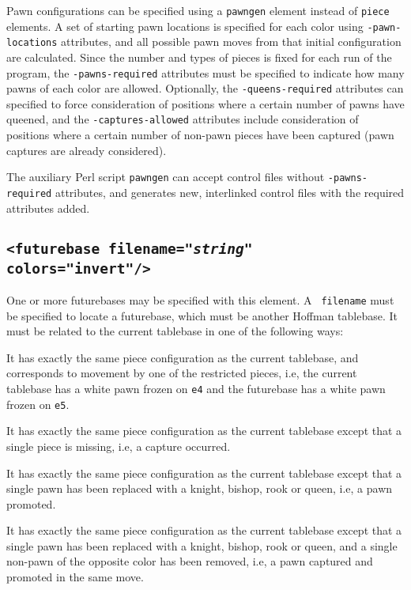\documentclass[11pt]{article}
\begin{document}
Pawn configurations can be specified using a {\tt pawngen} element
instead of {\tt piece} elements.  A set of starting pawn locations is
specified for each color using {\tt *-pawn-locations} attributes, and
all possible pawn moves from that initial configuration are
calculated.  Since the number and types of pieces is fixed for each
run of the program, the {\tt *-pawns-required} attributes must be
specified to indicate how many pawns of each color are allowed.
Optionally, the {\tt *-queens-required} attributes can specified to
force consideration of positions where a certain number of pawns have
queened, and the {\tt *-captures-allowed} attributes include
consideration of positions where a certain number of non-pawn pieces
have been captured (pawn captures are already considered).

The auxiliary Perl script {\tt pawngen} can accept control files
without {\tt *-pawns-required} attributes, and generates new,
interlinked control files with the required attributes added.

\subsection{\tt <futurebase filename="{\it string}" colors="invert"/>}

One or more futurebases may be specified with this element.  A {\tt
  filename} must be specified to locate a futurebase, which must be
another Hoffman tablebase.  It must be related to the current
tablebase in one of the following ways:

\begin{description}
\item It has exactly the same piece configuration as the
current tablebase, and corresponds to movement by one of the
restricted pieces, i.e, the current tablebase has a white pawn frozen
on {\tt e4} and the futurebase has a white pawn frozen on {\tt e5}.

\item It has exactly the same piece configuration as
the current tablebase except that a single piece is missing, i.e,
a capture occurred.

\item It has exactly the same piece configuration as the current
tablebase except that a single pawn has been replaced with a knight,
bishop, rook or queen, i.e, a pawn promoted.

\item It has exactly the same piece configuration as the current
tablebase except that a single pawn has been replaced with a knight,
bishop, rook or queen, and a single non-pawn of the opposite color has
been removed, i.e, a pawn captured and promoted in the same move.

\end{description}
\end{document}
